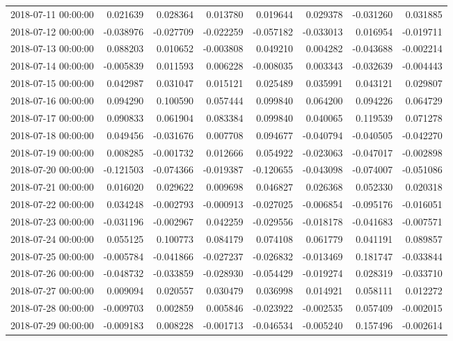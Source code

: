 \begin{tabular}{lrrrrrrr}
2018-07-11 00:00:00 & 0.021639 & 0.028364 & 0.013780 & 0.019644 & 0.029378 & -0.031260 & 0.031885 \\
2018-07-12 00:00:00 & -0.038976 & -0.027709 & -0.022259 & -0.057182 & -0.033013 & 0.016954 & -0.019711 \\
2018-07-13 00:00:00 & 0.088203 & 0.010652 & -0.003808 & 0.049210 & 0.004282 & -0.043688 & -0.002214 \\
2018-07-14 00:00:00 & -0.005839 & 0.011593 & 0.006228 & -0.008035 & 0.003343 & -0.032639 & -0.004443 \\
2018-07-15 00:00:00 & 0.042987 & 0.031047 & 0.015121 & 0.025489 & 0.035991 & 0.043121 & 0.029807 \\
2018-07-16 00:00:00 & 0.094290 & 0.100590 & 0.057444 & 0.099840 & 0.064200 & 0.094226 & 0.064729 \\
2018-07-17 00:00:00 & 0.090833 & 0.061904 & 0.083384 & 0.099840 & 0.040065 & 0.119539 & 0.071278 \\
2018-07-18 00:00:00 & 0.049456 & -0.031676 & 0.007708 & 0.094677 & -0.040794 & -0.040505 & -0.042270 \\
2018-07-19 00:00:00 & 0.008285 & -0.001732 & 0.012666 & 0.054922 & -0.023063 & -0.047017 & -0.002898 \\
2018-07-20 00:00:00 & -0.121503 & -0.074366 & -0.019387 & -0.120655 & -0.043098 & -0.074007 & -0.051086 \\
2018-07-21 00:00:00 & 0.016020 & 0.029622 & 0.009698 & 0.046827 & 0.026368 & 0.052330 & 0.020318 \\
2018-07-22 00:00:00 & 0.034248 & -0.002793 & -0.000913 & -0.027025 & -0.006854 & -0.095176 & -0.016051 \\
2018-07-23 00:00:00 & -0.031196 & -0.002967 & 0.042259 & -0.029556 & -0.018178 & -0.041683 & -0.007571 \\
2018-07-24 00:00:00 & 0.055125 & 0.100773 & 0.084179 & 0.074108 & 0.061779 & 0.041191 & 0.089857 \\
2018-07-25 00:00:00 & -0.005784 & -0.041866 & -0.027237 & -0.026832 & -0.013469 & 0.181747 & -0.033844 \\
2018-07-26 00:00:00 & -0.048732 & -0.033859 & -0.028930 & -0.054429 & -0.019274 & 0.028319 & -0.033710 \\
2018-07-27 00:00:00 & 0.009094 & 0.020557 & 0.030479 & 0.036998 & 0.014921 & 0.058111 & 0.012272 \\
2018-07-28 00:00:00 & -0.009703 & 0.002859 & 0.005846 & -0.023922 & -0.002535 & 0.057409 & -0.002015 \\
2018-07-29 00:00:00 & -0.009183 & 0.008228 & -0.001713 & -0.046534 & -0.005240 & 0.157496 & -0.002614 \\

\end{tabular}
